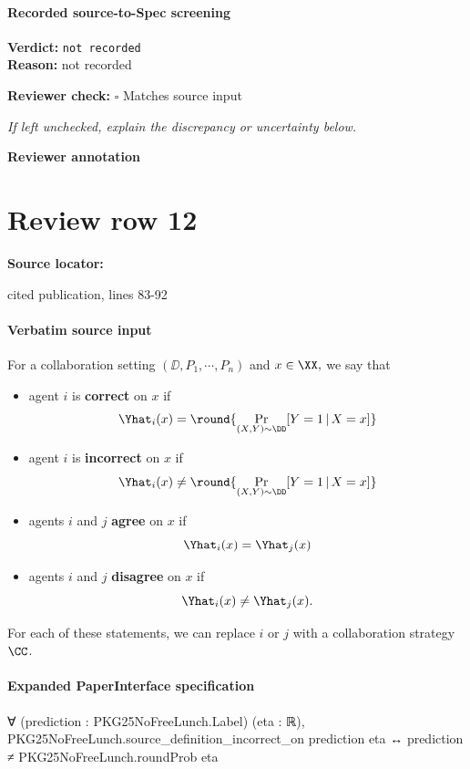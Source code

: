 \documentclass[10pt]{article}
\newcommand{\reviewerbox}{%
  \par\noindent\fbox{\parbox{0.96\linewidth}{\rule{0pt}{0.38in}}}\par
}
\newcommand{\reviewmatch}[1]{%
  \par\noindent\textbf{Reviewer check:} $\square$\; #1\par
  \noindent\emph{If left unchecked, explain the discrepancy or uncertainty below.}\par
}
\begin{document}
\paragraph{Recorded source-to-Spec screening}
\textbf{Verdict:} \texttt{not recorded}
\\
\textbf{Reason:} not recorded
\reviewmatch{Matches source input}
\noindent\textbf{Reviewer annotation}\par
\reviewerbox
\clearpage
\hypertarget{source-claim-c2574ffc8255a71d}{}
\section*{Review row 12}
\textbf{Source locator:} {\footnotesize\raggedright cited publication, lines 83-\allowbreak{}92\par}
\paragraph{Verbatim source input}
\begin{ReviewVerbatim}
\begin{definition}\label{def:correct}
For a collaboration setting $(\DD, P_1,\cdots,P_n)$ and $x\in \XX,$ we say that
\begin{itemize}
    \item agent $i$ is \textbf{correct} on $x$ if $$\Yhat_i(x) = \round{\Pr_{(X,Y)\sim \DD}[Y=1\,|\,X=x]}$$
    \item agent $i$ is \textbf{incorrect} on $x$ if $$\Yhat_i(x) \neq \round{\Pr_{(X,Y)\sim \DD}[Y=1\,|\,X=x]}$$
    \item agents $i$ and $j$ \textbf{agree} on $x$ if $$\Yhat_i(x) = \Yhat_j(x)$$
    \item agents $i$ and $j$ \textbf{disagree} on $x$ if $$\Yhat_i(x) \neq \Yhat_j(x).$$
\end{itemize}
For each of these statements, we can replace $i$ or $j$ with a collaboration strategy $\CC$.
\end{definition}
\end{ReviewVerbatim}


\paragraph{Expanded PaperInterface specification}
\begin{ReviewVerbatim}
∀ (prediction : PKG25NoFreeLunch.Label) (eta : ℝ),
  PKG25NoFreeLunch.source_definition_incorrect_on prediction eta ↔ prediction ≠ PKG25NoFreeLunch.roundProb eta
\end{ReviewVerbatim}
\end{document}
